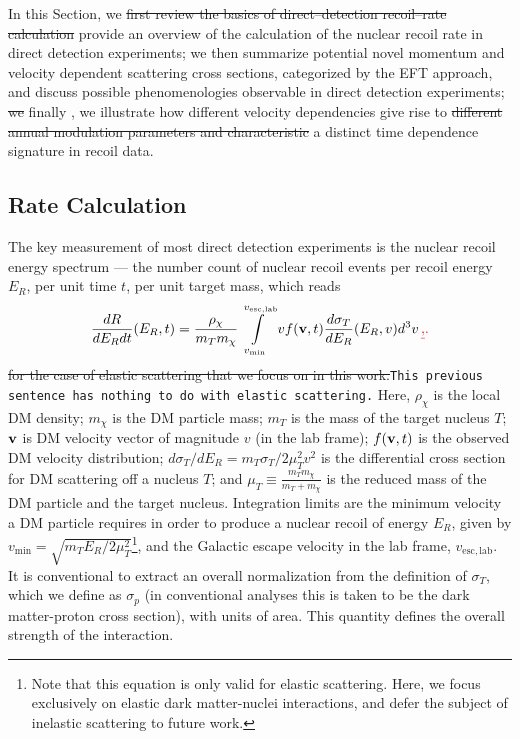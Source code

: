 \documentclass[11pt]{article}
\newcommand{\sjwColor}{red}
\newcommand{\sjw}[1]{{\color{\sjwColor} #1}}
\newcommand{\sjwrm}[1]{{\color{\sjwColor}\protect\sout{#1}}}
\newcommand{\sjwtt}[1]{{\color{\sjwColor}\tt #1}}
\begin{document}
In this Section, we \sjwrm{first review the basics of direct--detection recoil--rate calculation}\sjw{provide an overview of the calculation of the nuclear recoil rate in direct detection experiments}; we then summarize potential novel momentum and velocity dependent scattering cross sections, categorized by the EFT approach, and discuss possible phenomenologies observable in direct detection experiments; \sjwrm{we} finally\sjw{, we} illustrate how different velocity dependencies give rise to \sjwrm{different annual modulation parameters and characteristic}\sjw{a distinct} time dependence signature in recoil data.

\subsection{Rate Calculation}\label{sec:rate}

The key measurement of most direct detection experiments is the nuclear recoil energy spectrum --- the number count of nuclear recoil events per recoil energy $E_R$, per unit time $t$, per unit target mass, which reads
\begin{equation}
\frac{dR}{dE_R dt}(E_R,t) =  \frac{\rho_\chi}{m_T m_\chi} \int\limits_{v_{\mathrm{min}}}^{v_{\mathrm{esc, lab}}}  v f(\mathrm{\mbox{\bf{v}}},t) \frac{d\sigma_T}{dE_R} (E_R,v) d^3v \, \sjwrm{,}\sjw{.}
\label{eq:dRdEr_general}
\end{equation}
\sjwrm{for the case of elastic scattering that we focus on in this work.}\sjwtt{This previous sentence has nothing to do with elastic scattering.} Here, $\rho_\chi$ is the local DM density; $m_\chi$ is the DM particle mass; $m_T$ is the mass of the target nucleus $T$; $\mathrm{\mbox{\bf{v}}}$ is DM velocity vector of magnitude $v$ (in the lab frame); $f(\mathrm{\mbox{\bf{v}}}, t)$ is the observed DM velocity distribution; $d\sigma_T/dE_R=m_T \sigma_T /2\mu_T^2 v^2$ is the differential cross section for DM scattering off a nucleus $T$; and $\mu_T\equiv\frac{m_Tm_\chi}{m_T+m_\chi}$ is the reduced mass of the DM particle and the target nucleus. Integration limits are the minimum velocity a DM particle requires in order to produce a nuclear recoil of energy $E_R$, given by $v_\mathrm{min} = \sqrt{m_T E_R/2\mu_T^2}$\footnote{Note that this equation is only valid for elastic scattering. Here, we focus exclusively on elastic dark matter-nuclei interactions, and defer the subject of inelastic scattering to future work.}, and the Galactic escape velocity in the lab frame, $v_{\mathrm{esc, lab}}$. \sjw{It is conventional to extract an overall normalization from the definition of $\sigma_T$, which we define as $\sigma_p$ (in conventional analyses this is taken to be the dark matter-proton cross section), with units of area. This quantity defines the overall strength of the interaction. }
\end{document}
